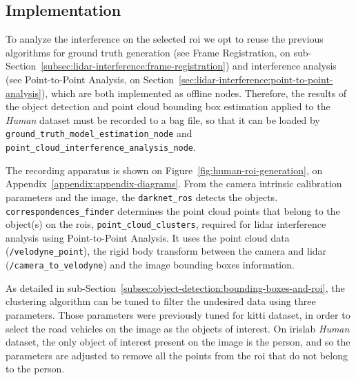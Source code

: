 \subsection{Implementation}
\label{subsec:lidar-interference:roi-implementation}
To analyze the interference on the selected \ac{roi} we opt to reuse the previous algorithms for ground truth generation (see Frame Registration, on sub-Section~\ref{subsec:lidar-interference:frame-registration}) and interference analysis (see Point-to-Point Analysis, on Section~\ref{sec:lidar-interference:point-to-point-analysis}), which are both implemented as offline nodes. Therefore, the results of the object detection and point cloud bounding box estimation applied to the \textit{Human} dataset must be recorded to a bag file, so that it can be loaded by \texttt{ground\_truth\_model\_estimation\_node} and \texttt{point\_cloud\_interference\_analysis\_node}.

The recording apparatus is shown on Figure~\ref{fig:human-roi-generation}, on Appendix~\ref{appendix:appendix-diagrams}. From the camera intrinsic calibration parameters and the image, the \texttt{darknet\_ros} detects the objects. \texttt{correspondences\_finder} determines the point cloud points that belong to the object(s) on the \acp{roi}, \texttt{point\_cloud\_clusters}, required for \ac{lidar} interference analysis using Point-to-Point Analysis. It uses the point cloud data (\texttt{/velodyne\_point}), the rigid body transform between the camera and \ac{lidar} (\texttt{/camera\_to\_velodyne}) and the image bounding boxes information.


%	

As detailed in sub-Section~\ref{subsec:object-detection:bounding-boxes-and-roi}, the clustering algorithm can be tuned to filter the undesired data using three parameters. Those parameters were previously tuned for \ac{kitti} dataset, in order to select the road vehicles on the image as the objects of interest. On \ac{irislab} \textit{Human} dataset, the only object of interest present on the image is the person, and so the parameters are adjusted to remove all the points from the \ac{roi} that do not belong to the person. 

